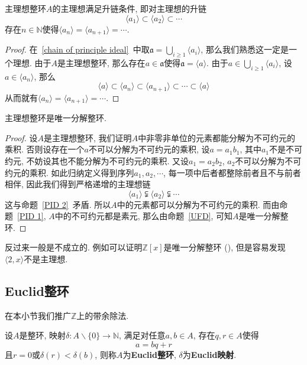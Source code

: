 \begin{prop}\label{PID 2}
    主理想整环$A$的主理想满足升链条件, 即对主理想的升链
    \begin{equation}
        \langle a_1\rangle\subset\langle a_2\rangle\subset\cdots\label{chain of principle ideal}
    \end{equation}
    存在$n\in\mathbb{N}$使得$\langle a_n\rangle=\langle a_{n+1}\rangle=\cdots$.
\end{prop}
\begin{proof}
    在~\eqref{chain of principle ideal}~中取$\mathfrak{a}=\bigcup_{i\geq 1}\langle a_i\rangle$, 那么我们熟悉这一定是一个理想.
    由于$A$是主理想整环, 那么存在$a\in\mathfrak{a}$使得$\mathfrak{a}=\langle a\rangle$.
    由于$a\in\bigcup_{i\geq 1}\langle a_i\rangle$, 设$a\in\langle a_n\rangle$, 那么
    \[\langle a\rangle\subset\langle a_n\rangle\subset\langle a_{n+1}\rangle\subset\cdots\subset\langle a\rangle\]
    从而就有$\langle a_n\rangle=\langle a_{n+1}\rangle=\cdots$.
\end{proof}

\begin{prop}
    主理想整环是唯一分解整环.
\end{prop}
\begin{proof}
    设$A$是主理想整环, 我们证明$A$中非零非单位的元素都能分解为不可约元的乘积.
    否则设存在一个$a$不可以分解为不可约元的乘积, 设$a=a_1b_1$, 其中$a_1$不是不可约元, 不妨设其也不能分解为不可约元的乘积.
    又设$a_1=a_2b_2$, $a_2$不可以分解为不可约元的乘积.
    如此归纳定义得到序列$a_1,a_2,\cdots$, 每一项中后者都整除前者且不与前者相伴, 因此我们得到严格递增的主理想链
    \[\langle a_1\rangle\subsetneqq\langle a_2\rangle\subsetneqq\cdots\]
    这与命题~\ref{PID 2}~矛盾.
    所以$A$中的元素都可以分解为不可约元的乘积.
    而由命题~\ref{PID 1}, $A$中的不可约元都是素元, 那么由命题~\ref{UFD}, 可知$A$是唯一分解整环.
\end{proof}

反过来一般是不成立的.
例如可以证明$\mathbb{Z}[x]$是唯一分解整环 (\parencite[p.\ 182定理2.3]{Lang}), 但是容易发现$\langle 2,x\rangle$不是主理想.

\subsection{Euclid整环}

在本小节我们推广$\mathbb{Z}$上的带余除法.

\begin{defn}
    设$A$是整环, 映射$\delta:A\backslash\{0\}\to\mathbb{N}$, 满足对任意$a,b\in A$, 存在$q,r\in A$使得
    \[a=bq+r\]
    且$r=0$或$\delta(r)<\delta(b)$, 则称$A$为\textbf{Euclid整环}, $\delta$为\textbf{Euclid映射}.
\end{defn}


